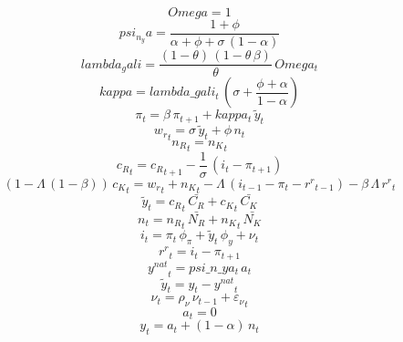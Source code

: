 \documentclass[10pt,a4paper]{article}
\begin{document}
\footnotesize
\begin{dmath*}
Omega = 1
\end{dmath*}
\begin{dmath*}
psi_n_ya = \frac{1+{\phi}}{{\alpha}+{\phi}+{\sigma}\, \left(1-{\alpha}\right)}
\end{dmath*}
\begin{dmath*}
lambda_gali = \frac{\left(1-{\theta}\right)\, \left(1-{\theta}\, {\beta}\right)}{{\theta}}\, Omega_{t}
\end{dmath*}
\begin{dmath*}
kappa = lambda\_gali_{t}\, \left({\sigma}+\frac{{\phi}+{\alpha}}{1-{\alpha}}\right)
\end{dmath*}
\begin{dmath}
{\pi}_{t}={\beta}\, {\pi}_{t+1}+kappa_{t}\, {\tilde y}_{t}
\end{dmath}
\begin{dmath}
{w_r}_{t}={\sigma}\, {\tilde y}_{t}+{\phi}\, {n}_{t}
\end{dmath}
\begin{dmath}
{n_R}_{t}={n_K}_{t}
\end{dmath}
\begin{dmath}
{c_R}_{t}={c_R}_{t+1}-\frac{1}{{\sigma}}\, \left({i}_{t}-{\pi}_{t+1}\right)
\end{dmath}
\begin{dmath}
\left(1-{\Lambda}\, \left(1-{\beta}\right)\right)\, {c_K}_{t}={w_r}_{t}+{n_K}_{t}-{\Lambda}\, \left({i}_{t-1}-{\pi}_{t}-{r^r}_{t-1}\right)-{\beta}\, {\Lambda}\, {r^r}_{t}
\end{dmath}
\begin{dmath}
{\tilde y}_{t}={c_R}_{t}\, \bar{C_R}+{c_K}_{t}\, \bar{C_K}
\end{dmath}
\begin{dmath}
{n}_{t}={n_R}_{t}\, \bar{N_R}+{n_K}_{t}\, \bar{N_K}
\end{dmath}
\begin{dmath}
{i}_{t}={\pi}_{t}\, {\phi_{\pi}}+{\tilde y}_{t}\, {\phi_{y}}+{\nu}_{t}
\end{dmath}
\begin{dmath}
{r^r}_{t}={i}_{t}-{\pi}_{t+1}
\end{dmath}
\begin{dmath}
{y^{nat}}_{t}=psi\_n\_ya_{t}\, {a}_{t}
\end{dmath}
\begin{dmath}
{\tilde y}_{t}={y}_{t}-{y^{nat}}_{t}
\end{dmath}
\begin{dmath}
{\nu}_{t}={\rho_{\nu}}\, {\nu}_{t-1}+{\varepsilon_\nu}_{t}
\end{dmath}
\begin{dmath}
{a}_{t}=0
\end{dmath}
\begin{dmath}
{y}_{t}={a}_{t}+\left(1-{\alpha}\right)\, {n}_{t}
\end{dmath}
\end{document}
